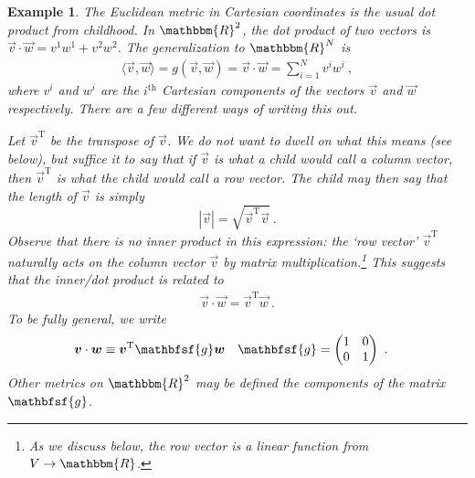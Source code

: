 \documentclass[
  11pt,
	colorful,
	raggedright,
]{tufte-style-thesis-flip}
\newtheorem{example}{Example}[section]
\newcommand{\tens}[1]{\mathbfsf{#1}}
\begin{document}
\begin{example} The Euclidean metric in Cartesian coordinates is the usual dot product from childhood. In $\mathbbm{R}^2$, the dot product of two vectors is $\vec{v}\cdot \vec{w} = v^1w^1 + v^2w^2$. The generalization to $\mathbbm{R}^N$ is
\begin{align}
  \langle \vec v, \vec w \rangle = g(\vec v, \vec w) = \vec v\cdot \vec w
  = \sum_{i=1}^N v^i w^i \ ,
  \label{ex:euclidean:R2:metric}
\end{align}
where $v^i$ and $w^i$ are the $i^\text{th}$ Cartesian components of the vectors $\vec v$ and $\vec w$ respectively. There are a few different ways of writing this out. 

Let $\vec v^\text{T}$ be the transpose of $\vec{v}$. We do not want to dwell on what this means (see below), but suffice it to say that if $\vec{v}$ is what a child would call a column vector, then $\vec v^\text{T}$ is what the child would call a row vector. The child may then say that the length of $\vec{v}$ is simply $$|\vec v| = \sqrt{\vec v^\text{T} \vec v}\ .$$ Observe that there is no inner product in this expression: the `row vector' $\vec v^\text{T}$ naturally acts on the column vector $\vec v$ by matrix multiplication.\footnote{As we discuss below, the row vector is a linear function from $V\to \mathbbm{R}$.} This suggests that the inner/dot product is related to
\begin{align}
  \vec v\cdot \vec w = \vec v^\text{T} \vec w \ .
\end{align}
To be fully general, we write
\begin{align}
  \vec v \cdot \vec w &\equiv \vec v^\text{T} \tens{g} \vec{w}
  &
  \tens{g} &= 
  \begin{pmatrix}
    1 & 0 \\
    0 & 1
  \end{pmatrix} \ .
  \label{eq:eg:R2:dot:product:matrix}
\end{align}
Other metrics on $\mathbbm{R}^2$ may be defined the components of the matrix $\tens{g}$. 


\end{example}
\end{document}

